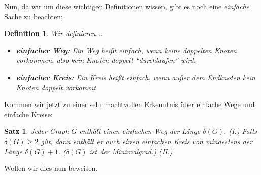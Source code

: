 \documentclass{article}
\newtheorem{theorem}{Satz}
\newtheorem{definition}{Definition}
\theoremstyle{plain}
\begin{document}
\vfill
\newpage
Nun, da wir um diese wichtigen Definitionen wissen, gibt es noch eine \emph{einfache} Sache zu beachten;\\
\begin{definition}
	Wir definieren...
	\begin{itemize}
		\item \textbf{einfacher Weg:} Ein Weg heißt \emph{einfach}, wenn keine doppelten Knoten vorkommen, also kein Knoten doppelt "`durchlaufen"' wird.
		\item \textbf{einfacher Kreis:} Ein Kreis heißt \emph{einfach}, wenn außer dem Endknoten kein Knoten doppelt vorkommt.
	\end{itemize}
\end{definition}
Kommen wir jetzt zu einer sehr machtvollen Erkenntnis über einfache Wege und einfache Kreise:\\
\begin{theorem}
	Jeder Graph $G$ enthält einen einfachen Weg der Länge $\delta(G)$. \emph{(I.)} Falls $\delta(G) \geq 2$ gilt, dann enthält er auch einen einfachen Kreis von mindestens der Länge $\delta(G) + 1$. ($\delta(G)$ ist der Minimalgrad.) \emph{(II.)}
\end{theorem}
Wollen wir dies nun beweisen.\\
\end{document}
